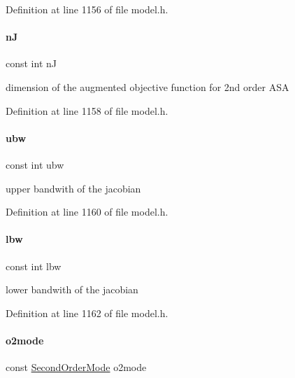 Definition at line 1156 of file model.\+h.

\mbox{\label{classamici_1_1_model_a0d2f49d2b15b08628451261e52f56e4f}} 
\paragraph{\texorpdfstring{nJ}{nJ}}
{\footnotesize\ttfamily const int nJ}

dimension of the augmented objective function for 2nd order A\+SA 

Definition at line 1158 of file model.\+h.

\mbox{\label{classamici_1_1_model_a8aac2b651892bb766a3cb79868944d81}} 
\paragraph{\texorpdfstring{ubw}{ubw}}
{\footnotesize\ttfamily const int ubw}

upper bandwith of the jacobian 

Definition at line 1160 of file model.\+h.

\mbox{\label{classamici_1_1_model_aa19cd03fcaffb7a0cebd666081c5a868}} 
\paragraph{\texorpdfstring{lbw}{lbw}}
{\footnotesize\ttfamily const int lbw}

lower bandwith of the jacobian 

Definition at line 1162 of file model.\+h.

\mbox{\label{classamici_1_1_model_acc235cad50283f7891e2d834f1cbeb90}} 
\paragraph{\texorpdfstring{o2mode}{o2mode}}
{\footnotesize\ttfamily const \mbox{\hyperlink{namespaceamici_a2d77779286167d5603a870bf9f6c21ba}{Second\+Order\+Mode}} o2mode}

